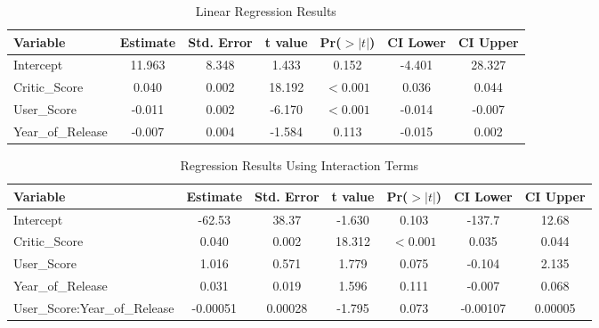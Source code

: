 \documentclass[12pt,english]{article}
\begin{document}

\begin{table}[ht]
\centering
\caption{Linear Regression Results }
\label{tab:regression_results}
\begin{tabular}{lcccccc}
\toprule
\textbf{Variable} & \textbf{Estimate} & \textbf{Std. Error} & \textbf{t value} & \textbf{Pr($>|t|$)} & \textbf{CI Lower} & \textbf{CI Upper} \\
\midrule
Intercept & 11.963 & 8.348 & 1.433 & 0.152 & -4.401 & 28.327 \\
Critic\_Score & 0.040 & 0.002 & 18.192 & $< 0.001$ & 0.036 & 0.044 \\
User\_Score & -0.011 & 0.002 & -6.170 & $< 0.001$ & -0.014 & -0.007 \\
Year\_of\_Release & -0.007 & 0.004 & -1.584 & 0.113 & -0.015 & 0.002 \\
\bottomrule
\end{tabular}
\end{table}


\begin{table}[ht]
\centering
\caption{Regression Results Using Interaction Terms}
\label{tab:regression_results_2}
\begin{tabular}{lcccccc}
\toprule
\textbf{Variable} & \textbf{Estimate} & \textbf{Std. Error} & \textbf{t value} & \textbf{Pr($>|t|$)} & \textbf{CI Lower} & \textbf{CI Upper} \\
\midrule
Intercept & -62.53 & 38.37 & -1.630 & 0.103 & -137.7 & 12.68 \\
Critic\_Score & 0.040 & 0.002 & 18.312 & $< 0.001$ & 0.035 & 0.044 \\
User\_Score & 1.016 & 0.571 & 1.779 & 0.075 & -0.104 & 2.135 \\
Year\_of\_Release & 0.031 & 0.019 & 1.596 & 0.111 & -0.007 & 0.068 \\
User\_Score:Year\_of\_Release & -0.00051 & 0.00028 & -1.795 & 0.073 & -0.00107 & 0.00005 \\
\bottomrule
\end{tabular}
\end{table}
\end{document}
